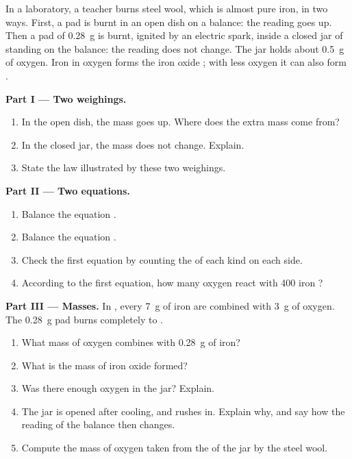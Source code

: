 \begin{problem}
\label{pb:g8:balanced-equations:1}
In a laboratory, a teacher burns steel wool, which is almost pure iron,
in two ways. First, a pad is burnt in an open dish on a balance: the
reading goes up. Then a pad of \qty{0.28}{g} is burnt, ignited by an
electric spark, inside a closed jar of  standing on the balance: the
reading does not change. The jar holds about \qty{0.5}{g} of oxygen.
Iron  in oxygen forms the iron oxide ; with less oxygen
it can also form .

\medskip
\noindent\textbf{Part I --- Two weighings.}
\begin{enumerate}
  \item In the open dish, the mass goes up. Where does the extra mass
        come from?
  \item In the closed jar, the mass does not change. Explain.
  \item State the law illustrated by these two weighings.
\end{enumerate}

\medskip
\noindent\textbf{Part II --- Two equations.}
\begin{enumerate}[resume]
  \item Balance the equation . %
  \item Balance the equation . %
  \item Check the first equation by counting the  of each kind on
        each side.
  \item According to the first equation, how many oxygen  react
        with 400 iron ?
\end{enumerate}

\medskip
\noindent\textbf{Part III --- Masses.}
In , every \qty{7}{g} of iron are combined with \qty{3}{g} of
oxygen. The \qty{0.28}{g} pad burns completely to .
\begin{enumerate}[resume]
  \item What mass of oxygen combines with \qty{0.28}{g} of iron?
  \item What is the mass of iron oxide formed?
  \item Was there enough oxygen in the jar? Explain.
  \item The jar is opened after cooling, and  rushes in. Explain why,
        and say how the reading of the balance then changes.
  \item Compute the mass of oxygen taken from the  of the jar by the
         steel wool.
\end{enumerate}
\end{problem}
